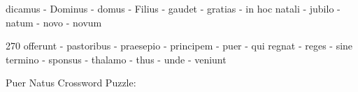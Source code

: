 \documentclass[12pt]{article}
\begin{document}
\pagestyle{fancy}
\fancyhf{}
\renewcommand{\headrulewidth}{0pt}
\renewcommand{\footrulewidth}{0pt}
\libertine
\renewcommand\PuzzleClueFont{\rm\normalsize}
\noindent\begin{rotate}{0}
\small  \qquad  \qquad dicamus - Dominus - domus - Filius - gaudet - gratias - in hoc natali - jubilo - natum - novo - novum 
\end{rotate}
\hfill
\begin{rotate}{270} \small \quad offerunt - pastoribus - praesepio - principem - puer - qui regnat - reges - sine termino - sponsus - thalamo - thus - unde - veniunt 
\end{rotate}
\begin{center}
  \huge{Puer Natus Crossword Puzzle:}
\end{center}
\vspace{1.5cm}
\end{document}
